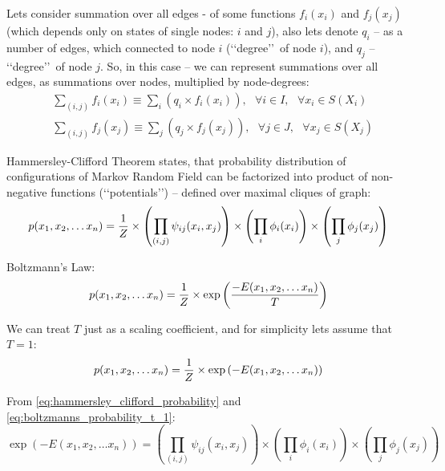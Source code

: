 \documentclass[fleqn,leqno]{article}
\begin{document}
Lets consider summation over all edges - of some functions $f_i(x_i)$ and $f_j(x_j)$ (which depends only on states of single nodes: $i$ and $j$), also lets denote $q_i$ -- as a number of edges, which connected to node $i$ (\lq \lq degree\rq \rq\ of node $i$), and $q_j$ -- \lq \lq degree\rq \rq\ of node $j$. So, in this case -- we can represent summations over all edges, as summations over nodes, multiplied by node-degrees:
\begin{equation} \label{eq:sum_over_edges_to_sum_over_nodes}
\begin{split}
   & \sum_{(i,j)} f_i(x_i) \equiv \sum_{i} \left( q_i \times f_i(x_i) \right),\ \ \ \forall i \in I,\ \ \ \forall x_i \in S(X_i) \\
   & \sum_{(i,j)} f_j(x_j) \equiv \sum_{j} \left( q_j \times f_j(x_j) \right),\ \ \ \forall j \in J,\ \ \ \forall x_j \in S(X_j)
\end{split}
\end{equation}

Hammersley-Clifford Theorem \cite{hammersley_clifford_original, hammersley_clifford_proof, wikipedia_hammersley_clifford} states, that probability distribution of configurations of Markov Random Field can be factorized into product of non-negative functions (\lq \lq potentials\rq \rq) -- defined over maximal cliques of graph:
\begin{equation} \label{eq:hammersley_clifford_probability}
p(x_1, x_2, \dots x_n) = {1 \over Z} \times \left( \prod_{(i, j)} \psi_{ij}(x_i, x_j) \right) \times \left( \prod_{i} \phi_i(x_i) \right) \times \left( \prod_{j} \phi_j(x_j) \right)
\end{equation}

Boltzmann's Law:
\begin{equation*}
p(x_1, x_2, \dots x_n) = {1 \over Z} \times \exp \left( {-E(x_1, x_2, \dots x_n) \over T} \right)
\end{equation*}

We can treat $T$ just as a scaling coefficient, and for simplicity lets assume that $T = 1$:
\begin{equation} \label{eq:boltzmanns_probability_t_1}
p(x_1, x_2, \dots x_n) = {1 \over Z} \times \exp \left(-E(x_1, x_2, \dots x_n) \right)
\end{equation}

From \eqref{eq:hammersley_clifford_probability} and \eqref{eq:boltzmanns_probability_t_1}:
\begin{equation*}
\exp \left(-E(x_1, x_2, \dots x_n) \right) = \left( \prod_{(i, j)} \psi_{ij}(x_i, x_j) \right) \times \left( \prod_{i} \phi_i(x_i) \right) \times \left( \prod_{j} \phi_j(x_j) \right)
\end{equation*}
\end{document}
